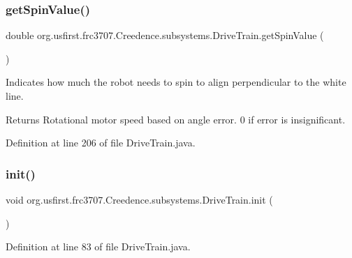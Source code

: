 \subsubsection{\texorpdfstring{getSpinValue()}{getSpinValue()}}
{\footnotesize\ttfamily double org.\+usfirst.\+frc3707.\+Creedence.\+subsystems.\+Drive\+Train.\+get\+Spin\+Value (\begin{DoxyParamCaption}{ }\end{DoxyParamCaption})}

Indicates how much the robot needs to spin to align perpendicular to the white line.

\begin{DoxyReturn}{Returns}
Rotational motor speed based on angle error. 0 if error is insignificant. 
\end{DoxyReturn}


Definition at line 206 of file Drive\+Train.\+java.

\mbox{\label{classorg_1_1usfirst_1_1frc3707_1_1_creedence_1_1subsystems_1_1_drive_train_a44d6db76496727831b99961ff9fa622f}} 
\subsubsection{\texorpdfstring{init()}{init()}}
{\footnotesize\ttfamily void org.\+usfirst.\+frc3707.\+Creedence.\+subsystems.\+Drive\+Train.\+init (\begin{DoxyParamCaption}{ }\end{DoxyParamCaption})}



Definition at line 83 of file Drive\+Train.\+java.

